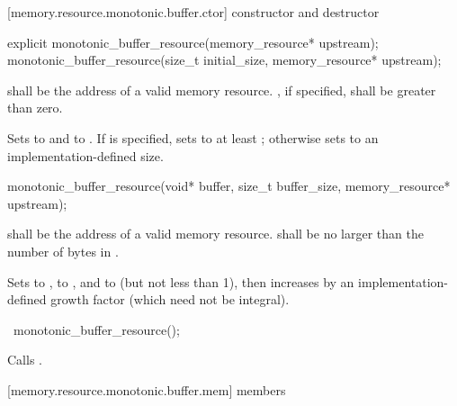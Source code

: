 [memory.resource.monotonic.buffer.ctor]{ constructor and destructor}

%
\begin{itemdecl}
explicit monotonic_buffer_resource(memory_resource* upstream);
monotonic_buffer_resource(size_t initial_size, memory_resource* upstream);
\end{itemdecl}

\begin{itemdescr}
\pnum
\requires
{} shall be the address of a valid memory resource.
, if specified, shall be greater than zero.

\pnum
\effects
Sets  to  and
 to .
If  is specified,
sets  to at least ;
otherwise sets  to an implementation-defined size.
\end{itemdescr}

%
\begin{itemdecl}
monotonic_buffer_resource(void* buffer, size_t buffer_size, memory_resource* upstream);
\end{itemdecl}

\begin{itemdescr}
\pnum
\requires
{} shall be the address of a valid memory resource.
 shall be no larger than the number of bytes in .

\pnum
\effects
Sets  to ,
 to , and
 to  (but not less than 1),
then increases 
by an implementation-defined growth factor (which need not be integral).
\end{itemdescr}

%
\begin{itemdecl}
~monotonic_buffer_resource();
\end{itemdecl}

\begin{itemdescr}
\pnum
\effects
Calls .
\end{itemdescr}


[memory.resource.monotonic.buffer.mem]{ members}

